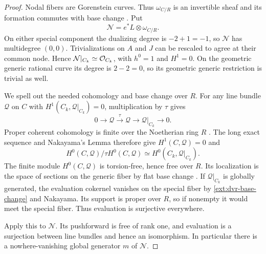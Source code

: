 \begin{proof}
Nodal fibers are Gorenstein curves. Thus $\omega_{C/R}$ is an
invertible sheaf and its formation commutes with base change
\cite[Tag ]{Stacks}. Put
\[
\mathcal N=e^*L\otimes\omega_{C/R}.
\]
On either special component the dualizing degree is $-2+1=-1$,
so $\mathcal N$ has multidegree $(0,0)$. Trivializations on $A$ and
$J$ can be rescaled to agree at their common node. Hence
$\mathcal N|_{C_k}\simeq\mathcal O_{C_k}$, with $h^0=1$ and $H^1=0$.
On the geometric generic rational curve its degree is $2-2=0$,
so its geometric generic restriction is trivial as well.

We spell out the needed cohomology and base change over $R$.
For any line bundle $\mathcal Q$ on $C$ with
$H^1(C_k,\mathcal Q|_{C_k})=0$, multiplication by $\tau$ gives
\[
0\longrightarrow\mathcal Q\xrightarrow{\ \tau\ }
\mathcal Q\longrightarrow\mathcal Q|_{C_k}\longrightarrow0.
\]
Proper coherent cohomology is finite over the Noetherian ring $R$
\cite[Section~30.19, Tag ]{Stacks}. The long exact sequence
and Nakayama's Lemma therefore give $H^1(C,\mathcal Q)=0$ and
\begin{equation}\label{ext:dvr-base-change}
H^0(C,\mathcal Q)/\tau H^0(C,\mathcal Q)
\simeq H^0(C_k,\mathcal Q|_{C_k}).
\end{equation}
The finite module $H^0(C,\mathcal Q)$ is torsion-free, hence free
over $R$. Its localization is the space of sections on the generic
fiber by flat base change \cite[Section~30.5, Tag ]{Stacks}.
If $\mathcal Q|_{C_k}$ is globally generated, the evaluation
cokernel vanishes on the special fiber by
\eqref{ext:dvr-base-change} and Nakayama. Its support is proper
over $R$, so if nonempty it would meet the special fiber. Thus
evaluation is surjective everywhere.

Apply this to $\mathcal N$. Its pushforward is free of rank one,
and evaluation is a surjection between line bundles and hence an
isomorphism. In particular there is a nowhere-vanishing global
generator $m$ of $\mathcal N$.


\end{proof}
